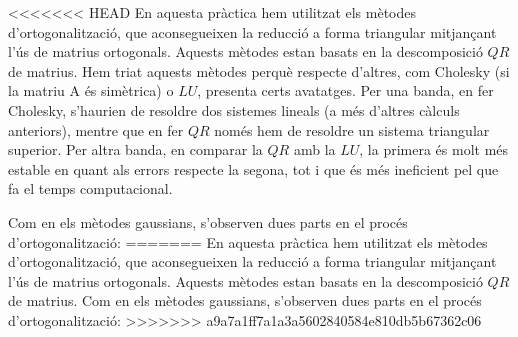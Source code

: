 \documentclass{article}
\begin{document}
<<<<<<< HEAD
En aquesta pràctica hem utilitzat els mètodes d'ortogonalització, que aconsegueixen la reducció a forma triangular mitjançant l'ús de matrius ortogonals. Aquests mètodes estan basats en la descomposició $QR$ de matrius. Hem triat aquests mètodes perquè respecte d'altres, com Cholesky (si la matriu A és simètrica) o $LU$, presenta certs avatatges. Per una banda, en fer Cholesky, s'haurien de resoldre dos sistemes lineals (a més d'altres càlculs anteriors), mentre que en fer $QR$ només hem de resoldre un sistema triangular superior. Per altra banda, en comparar la $QR$ amb la $LU$, la primera és molt més estable en quant als errors respecte la segona, tot i que és més ineficient pel que fa el temps computacional.

Com en els mètodes gaussians, s'observen dues parts en el procés d'ortogonalització:
=======
En aquesta pràctica hem utilitzat els mètodes d'ortogonalització, que aconsegueixen la reducció a forma triangular mitjançant l'ús de matrius ortogonals. Aquests mètodes estan basats en la descomposició $QR$ de matrius. Com en els mètodes gaussians, s'observen dues parts en el procés d'ortogonalització:
>>>>>>> a9a7a1ff7a1a3a5602840584e810db5b67362c06
\end{document}
